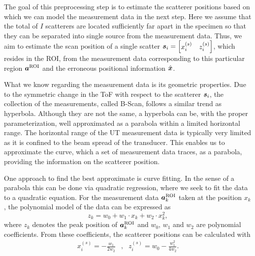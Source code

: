 The goal of this preprocessing step is to estimate the scatterer positions based on which we can model the measurement data in the next step. Here we assume that the total of $I$ scatterers are located sufficiently far apart in the specimen so that they can be separated into single source from the measurement data. Thus, we aim to estimate the scan position of a single scatter $\bm{s}_{i} = \begin{bmatrix} x^{(s)}_{i} & z^{(s)}_{i} \end{bmatrix}$, which resides in the ROI, from the measurement data corresponding to this particular region $\bm{a}_{}^{\operatorname{ROI}}$ and the erroneous positional information $\hat{\bm{x}}$. \par

What we know regarding the measurement data is its geometric properties. Due to the symmetric change in the ToF with respect to the scatterer $\bm{s}_{i}$, the collection of the measurements, called B-Scan, follows a similar trend as hyperbola. Although they are not the same, a hyperbola can be, with the proper parameterization, well approximated as a parabola within a limited horizontal range. The horizontal range of the UT measurement data is typically very limited as it is confined to the beam spread of the transducer. This enables us to approximate the curve, which a set of measurement data traces, as a parabola, providing the information on the scatterer position. \par 

One approach to find the best approximate is curve fitting. In the sense of a parabola this can be done via quadratic regression, where we seek to fit the data to a quadratic equation. For the measurement data $\bm{a}_{k}^{\operatorname{ROI}}$ taken at the position $x_{k}$, the polynomial model of the data can be expressed as 
\begin{equation} \label{eq:CF_polynomial}
	z_k = w_0 + w_1 \cdot x_k + w_2 \cdot x_k^{2},
\end{equation}
where $z_k$ denotes the peak position of $\bm{a}_{k}^{\operatorname{ROI}}$ and $w_0$, $w_1$ and $w_2$ are polynomial coefficients. From these coefficients, the scatterer positions can be calculated with
\begin{eqnarray} \label{eq:CF_scatterer}
	x^{(s)}_i =  - \frac{w_1}{2 w_2} & \mbox{,} & z^{(s)}_i  = w_0 - \frac{w_{1}^{2}}{4 w_2}.
\end{eqnarray}

